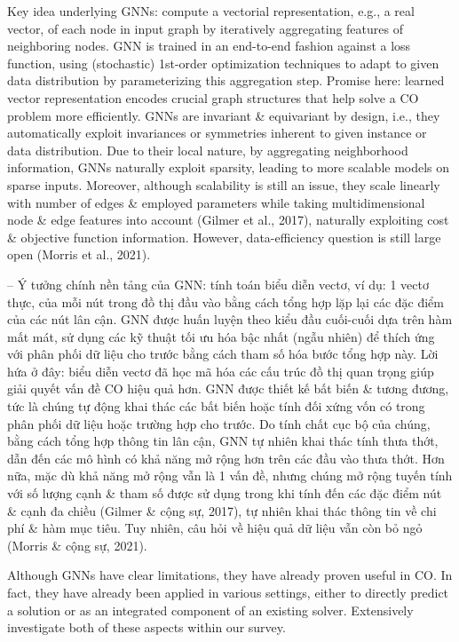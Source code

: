 \documentclass{article}
\begin{document}
\begin{itemize}
\begin{itemize}
        Key idea underlying GNNs: compute a vectorial representation, e.g., a real vector, of each node in input graph by iteratively aggregating features of neighboring nodes. GNN is trained in an end-to-end fashion against a loss function, using (stochastic) 1st-order optimization techniques to adapt to given data distribution by parameterizing this aggregation step. Promise here: learned vector representation encodes crucial graph structures that help solve a CO problem more efficiently. GNNs are invariant \& equivariant by design, i.e., they automatically exploit invariances or symmetries inherent to given instance or data distribution. Due to their local nature, by aggregating neighborhood information, GNNs naturally exploit sparsity, leading to more scalable models on sparse inputs. Moreover, although scalability is still an issue, they scale linearly with number of edges \& employed parameters while taking multidimensional node \& edge features into account (Gilmer et al., 2017), naturally exploiting cost \& objective function information. However, data-efficiency question is still large open (Morris et al., 2021).

        -- Ý tưởng chính nền tảng của GNN: tính toán biểu diễn vectơ, ví dụ: 1 vectơ thực, của mỗi nút trong đồ thị đầu vào bằng cách tổng hợp lặp lại các đặc điểm của các nút lân cận. GNN được huấn luyện theo kiểu đầu cuối-cuối dựa trên hàm mất mát, sử dụng các kỹ thuật tối ưu hóa bậc nhất (ngẫu nhiên) để thích ứng với phân phối dữ liệu cho trước bằng cách tham số hóa bước tổng hợp này. Lời hứa ở đây: biểu diễn vectơ đã học mã hóa các cấu trúc đồ thị quan trọng giúp giải quyết vấn đề CO hiệu quả hơn. GNN được thiết kế bất biến \& tương đương, tức là chúng tự động khai thác các bất biến hoặc tính đối xứng vốn có trong phân phối dữ liệu hoặc trường hợp cho trước. Do tính chất cục bộ của chúng, bằng cách tổng hợp thông tin lân cận, GNN tự nhiên khai thác tính thưa thớt, dẫn đến các mô hình có khả năng mở rộng hơn trên các đầu vào thưa thớt. Hơn nữa, mặc dù khả năng mở rộng vẫn là 1 vấn đề, nhưng chúng mở rộng tuyến tính với số lượng cạnh \& tham số được sử dụng trong khi tính đến các đặc điểm nút \& cạnh đa chiều (Gilmer \& cộng sự, 2017), tự nhiên khai thác thông tin về chi phí \& hàm mục tiêu. Tuy nhiên, câu hỏi về hiệu quả dữ liệu vẫn còn bỏ ngỏ (Morris \& cộng sự, 2021).

        Although GNNs have clear limitations, they have already proven useful in CO. In fact, they have already been applied in various settings, either to directly predict a solution or as an integrated component of an existing solver. Extensively investigate both of these aspects within our survey.


\end{itemize}
\end{itemize}
\end{document}
